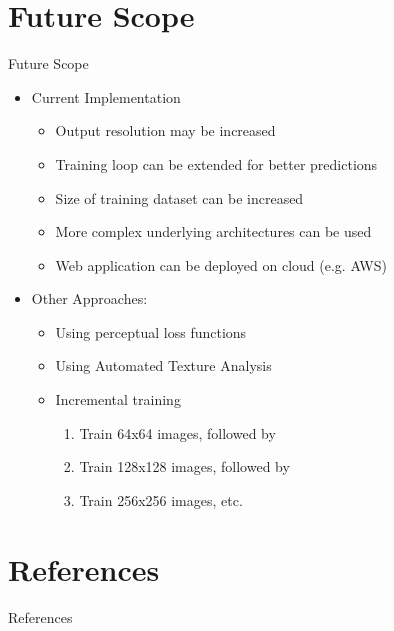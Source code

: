 \documentclass{beamer}
\begin{document}
\section{Future Scope}
	\begin{frame}{Future Scope}
		\begin{itemize}
			\item Current Implementation
			\begin{itemize}
				\item Output resolution may be increased
				\item Training loop can be extended for better predictions
				\item Size of training dataset can be increased
				\item More complex underlying architectures can be used
				\item Web application can be deployed on cloud (e.g. AWS)
			\end{itemize}
			\item Other Approaches:
			\begin{itemize}
				\item Using perceptual loss functions
				\item Using Automated Texture Analysis
				\item Incremental training
					\begin{enumerate}
						\item Train 64x64 images, followed by
						\item Train 128x128 images, followed by
						\item Train 256x256 images, etc.
					\end{enumerate}
			\end{itemize}
		\end{itemize}
	\end{frame}

\section{References}
	\begin{frame}[allowframebreaks]{References}
		
		\begin{thebibliography}{30}
		
		\end{thebibliography}
	
	\end{frame}
\end{document}
